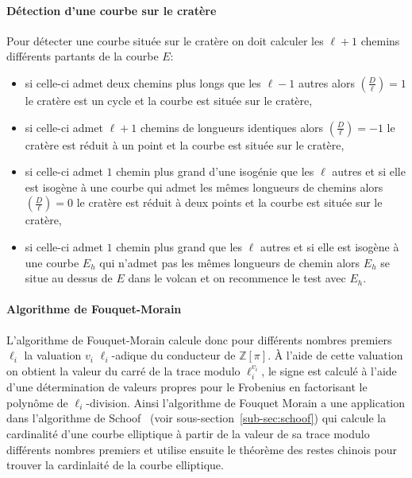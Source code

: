 \documentclass[10pt,a4paper]{book}
\theoremstyle{plain}
\theoremstyle{definition}
\theoremstyle{definition}
\theoremstyle{definition}
\theoremstyle{definition}
\theoremstyle{remark}
\theoremstyle{remark}
\theoremstyle{definition}
\begin{document}
\paragraph{Détection d'une courbe sur le cratère}
Pour détecter une courbe située sur le cratère on doit calculer les $\ell+1$ chemins différents partants de la courbe $E$:
\begin{itemize}
\item si celle-ci admet deux chemins plus longs que les $\ell-1$ autres alors 
$\left( \frac{D}{\ell} \right) = 1$ le cratère est un cycle et la courbe est
située sur le cratère,
\item si celle-ci admet $\ell+1$ chemins de longueurs identiques alors $\left( 
\frac{D}{\ell} \right) = -1$ le cratère est réduit à un point et la courbe est
située sur le cratère,
\item si celle-ci admet $1$ chemin plus grand d'une isogénie que les $\ell$ 
autres et si elle est isogène à une courbe qui admet les mêmes longueurs de 
chemins alors $\left( \frac{D}{\ell} \right) = 0$ le cratère est réduit à deux 
points et la courbe est située sur le cratère,
\item si celle-ci admet $1$ chemin plus grand que les $\ell$ autres et si elle 
est isogène à une courbe $E_h$ qui n'admet pas les mêmes longueurs de chemin 
alors $E_h$ se situe au dessus de $E$ dans le volcan et on recommence le test 
avec $E_h$.
\end{itemize}

\paragraph{Algorithme de Fouquet-Morain}
L'algorithme de Fouquet-Morain \cite{FouquetMorain02} calcule donc pour 
différents nombres premiers $\ell_i$ la valuation $v_i$ $\ell_i$-adique du 
conducteur de $\mathbb{Z}[\pi]$. \`A l'aide de cette valuation on obtient la 
valeur du carré de la trace modulo $\ell_i^{v_i}$, le signe est calculé à 
l'aide d'une détermination de valeurs propres pour le Frobenius en factorisant 
le polynôme de $\ell_i$-division. Ainsi l'algorithme de Fouquet Morain a une 
application dans l'algorithme de Schoof~\cite{Schoof85} (voir 
sous-section~\ref{sub-sec:schoof}) qui calcule la cardinalité d'une courbe
elliptique à partir de la valeur de sa trace modulo différents nombres premiers
et utilise ensuite le théorème des restes chinois pour trouver la cardinlaité 
de la courbe elliptique. 
\end{document}
